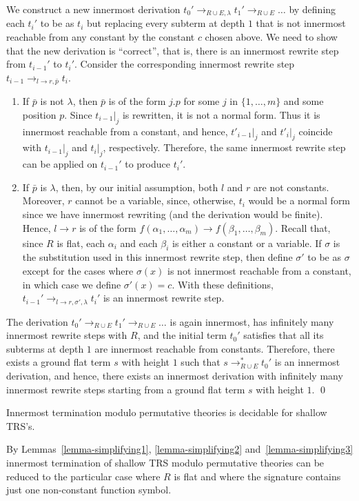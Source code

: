 \documentclass{LMCS}
\theoremstyle{plain}
\begin{document}
We construct a new innermost derivation
$t_0'\rightarrow_{R\cup E,\lambda} t_1'\rightarrow_{R\cup E}\ldots$
by defining each $t_i'$ to be as $t_i$ but replacing every
subterm at depth $1$ that is not innermost reachable from any constant
by the constant $c$ chosen above. We need to show that 
the new derivation is ``correct'', that is,
there is an innermost rewrite step from $t_{i-1}'$ to $t_{i}'$.
Consider the corresponding innermost rewrite step 
$t_{i-1}\rightarrow_{l\rightarrow r,\bar{p}} t_i$.
\begin{enumerate}[$\bullet$]
\item If $\bar{p}$ is not $\lambda$, then $\bar{p}$ is
of the form $j.p$ for some $j$ in $\{1,\ldots,m\}$
and some position $p$. Since $t_{i-1}|_j$ is rewritten,
it is not a normal form. Thus it is innermost reachable from a constant,
and hence, $t'_{i-1}|_j$ and $t'_{i}|_j$ coincide with
$t_{i-1}|_j$ and $t_i|_j$, respectively.
Therefore, the same innermost rewrite step can be applied on $t_{i-1}'$
to produce $t_i'$.
\item If $\bar{p}$ is $\lambda$, then,
by our initial assumption, both $l$ and $r$ are not constants.
Moreover, $r$ cannot be a variable, since, 
otherwise, $t_i$ would be a normal form
since we have innermost rewriting (and the derivation would
be finite).
Hence, $l\rightarrow r$ is of the form
$f(\alpha_1,\ldots,\alpha_m)\rightarrow f(\beta_1,\ldots,\beta_m)$.
Recall that, since $R$ is flat, each $\alpha_i$ and each $\beta_i$
is either a constant or a variable.
If $\sigma$ is the substitution used in this innermost rewrite step,
then define $\sigma'$ to be as $\sigma$ except for the cases where 
$\sigma(x)$ is not innermost reachable from a constant, in which case we
define $\sigma'(x)=c$. With these definitions,
$t_{i-1}' \rightarrow_{l\rightarrow r,\sigma',\lambda} t_i'$
is an innermost rewrite step.
\end{enumerate}
The derivation $t_0'\rightarrow_{R\cup E}
t_1'\rightarrow_{R\cup E}\ldots$ is again innermost,
has infinitely many innermost rewrite steps with $R$, and the
initial term $t_0'$ satisfies that all its
subterms at depth $1$ are innermost reachable from constants.
Therefore, there exists a ground flat term $s$ with height $1$ such that
$s\rightarrow_{R\cup E}^* t_0'$ is an innermost derivation,
and hence, there exists
an innermost derivation with infinitely many innermost rewrite
steps starting from a ground flat term $s$
with height $1$.  \qed




\begin{thm}\label{theorem-innermost}
Innermost termination modulo permutative theories is decidable
for shallow TRS's.
\end{thm}
\proof
By Lemmas~\ref{lemma-simplifying1}, \ref{lemma-simplifying2}
and~\ref{lemma-simplifying3}
innermost termination of shallow TRS modulo permutative theories can
be reduced to the particular case where $R$ is flat
and where the signature contains just one non-constant function symbol.
\end{document}
